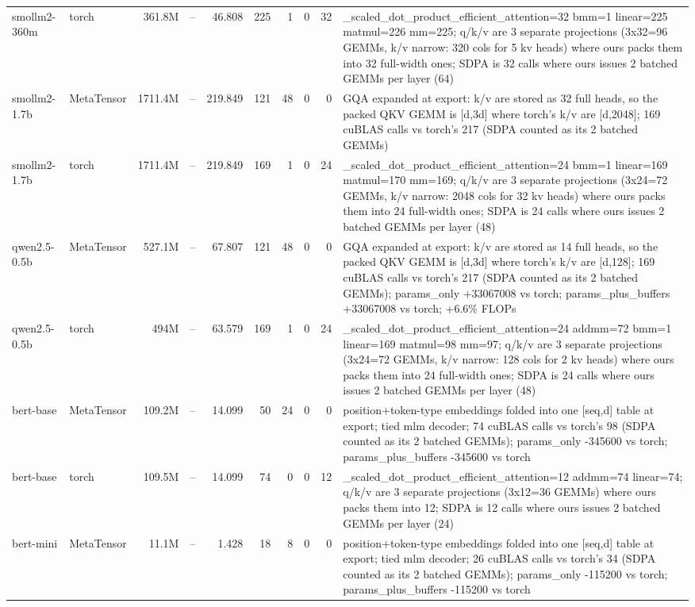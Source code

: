 \begin{tabular}{llrrrrrrrp{}}
smollm2-360m & torch & 361.8M & -- & 46.808 & 225 & 1 & 0 & 32 & \_scaled\_dot\_product\_efficient\_attention=32 bmm=1 linear=225 matmul=226 mm=225; q/k/v are 3 separate projections (3x32=96 GEMMs, k/v narrow: 320 cols for 5 kv heads) where ours packs them into 32 full-width ones; SDPA is 32 calls where ours issues 2 batched GEMMs per layer (64) \\
smollm2-1.7b & MetaTensor & 1711.4M & -- & 219.849 & 121 & 48 & 0 & 0 & GQA expanded at export: k/v are stored as 32 full heads, so the packed QKV GEMM is [d,3d] where torch's k/v are [d,2048]; 169 cuBLAS calls vs torch's 217 (SDPA counted as its 2 batched GEMMs) \\
smollm2-1.7b & torch & 1711.4M & -- & 219.849 & 169 & 1 & 0 & 24 & \_scaled\_dot\_product\_efficient\_attention=24 bmm=1 linear=169 matmul=170 mm=169; q/k/v are 3 separate projections (3x24=72 GEMMs, k/v narrow: 2048 cols for 32 kv heads) where ours packs them into 24 full-width ones; SDPA is 24 calls where ours issues 2 batched GEMMs per layer (48) \\
qwen2.5-0.5b & MetaTensor & 527.1M & -- & 67.807 & 121 & 48 & 0 & 0 & GQA expanded at export: k/v are stored as 14 full heads, so the packed QKV GEMM is [d,3d] where torch's k/v are [d,128]; 169 cuBLAS calls vs torch's 217 (SDPA counted as its 2 batched GEMMs); params\_only +33067008 vs torch; params\_plus\_buffers +33067008 vs torch; +6.6\% FLOPs \\
qwen2.5-0.5b & torch & 494M & -- & 63.579 & 169 & 1 & 0 & 24 & \_scaled\_dot\_product\_efficient\_attention=24 addmm=72 bmm=1 linear=169 matmul=98 mm=97; q/k/v are 3 separate projections (3x24=72 GEMMs, k/v narrow: 128 cols for 2 kv heads) where ours packs them into 24 full-width ones; SDPA is 24 calls where ours issues 2 batched GEMMs per layer (48) \\
bert-base & MetaTensor & 109.2M & -- & 14.099 & 50 & 24 & 0 & 0 & position+token-type embeddings folded into one [seq,d] table at export; tied mlm decoder; 74 cuBLAS calls vs torch's 98 (SDPA counted as its 2 batched GEMMs); params\_only -345600 vs torch; params\_plus\_buffers -345600 vs torch \\
bert-base & torch & 109.5M & -- & 14.099 & 74 & 0 & 0 & 12 & \_scaled\_dot\_product\_efficient\_attention=12 addmm=74 linear=74; q/k/v are 3 separate projections (3x12=36 GEMMs) where ours packs them into 12; SDPA is 12 calls where ours issues 2 batched GEMMs per layer (24) \\
bert-mini & MetaTensor & 11.1M & -- & 1.428 & 18 & 8 & 0 & 0 & position+token-type embeddings folded into one [seq,d] table at export; tied mlm decoder; 26 cuBLAS calls vs torch's 34 (SDPA counted as its 2 batched GEMMs); params\_only -115200 vs torch; params\_plus\_buffers -115200 vs torch \\

\end{tabular}
